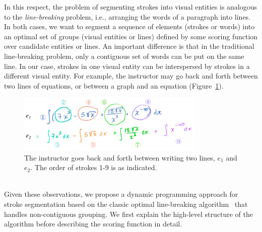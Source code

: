 In this respect, the problem of segmenting strokes into visual
entities is analogous to the
\emph{line-breaking} problem, i.e., arranging the words of a paragraph
into lines.  In both cases, we want to segment a sequence of elements
(strokes or words) into an optimal set of groups (visual entities or
lines) defined by some scoring function over candidate entities or lines.
An important difference is that in the traditional line-breaking problem, only a
contiguous set of words can be put on the same line. In our case,
strokes in one visual entity can be interspersed by strokes in a
different visual entity. For example, the instructor may
go back and forth between two lines of equations, or
between a graph and an equation (Figure~\ref{Fig:line_order}).\\
%
\begin{figure}[h]
        \centering
        \includegraphics[width=0.8\textwidth]{figures/line_order.pdf}
        \caption{The instructor goes back and forth between writing two lines,
$e_1$ and $e_2$. The order of strokes 1-9 is as indicated.}
        \label{Fig:line_order}
\end{figure}\\
%

Given these observations, we propose a dynamic programming approach for
stroke segmentation based on the classic optimal line-breaking
algorithm~\cite{knuth1981breaking} that handles non-contiguous grouping.
We first explain the high-level structure of the algorithm before
describing the scoring function in detail.
%
